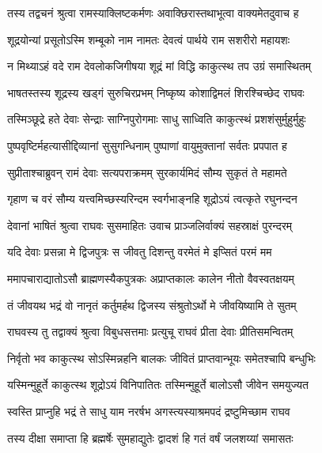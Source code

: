 
\twolineshloka
{तस्य तद्वचनं श्रुत्वा रामस्याक्लिष्टकर्मणः}
{अवाक्छिरास्तथाभूत्वा वाक्यमेतदुवाच ह} %

\twolineshloka
{शूद्रयोन्यां प्रसूतोऽस्मि शम्बूको नाम नामतः}
{देवत्वं पार्थये राम सशरीरो महायशः} %

\twolineshloka
{न मिथ्याऽहं वदे राम देवलोकजिगीषया}
{शूद्रं मां विद्धि काकुत्स्थ तप उग्रं समास्थितम्} %

\twolineshloka
{भाषतस्तस्य शूद्रस्य खड्गं सुरुचिरप्रभम्}
{निष्कृष्य कोशाद्विमलं शिरश्चिच्छेद राघवः} %

\twolineshloka
{तस्मिञ्छूद्रे हते देवाः सेन्द्राः साग्निपुरोगमाः}
{साधु साध्विति काकुत्स्थं प्रशशंसुर्मुहुर्मुहुः} %

\twolineshloka
{पुष्पवृष्टिर्महत्यासीद्दिव्यानां सुसुगन्धिनाम्}
{पुष्पाणां वायुमुक्तानां सर्वतः प्रपपात ह} %

\twolineshloka
{सुप्रीताश्चाब्रुवन् रामं देवाः सत्यपराक्रमम्}
{सुरकार्यमिदं सौम्य सुकृतं ते महामते} %

\twolineshloka
{गृहाण च वरं सौम्य यत्त्वमिच्छस्यरिन्दम}
{स्वर्गभाङ्नहि शूद्रोऽयं त्वत्कृते रघुनन्दन} %

\twolineshloka
{देवानां भाषितं श्रुत्वा राघवः सुसमाहितः}
{उवाच प्राञ्जलिर्वाक्यं सहस्राक्षं पुरन्दरम्} %

\twolineshloka
{यदि देवाः प्रसन्ना मे द्विजपुत्रः स जीवतु}
{दिशन्तु वरमेतं मे इप्सितं परमं मम} %

\twolineshloka
{ममापचाराद्यातोऽसौ ब्राह्मणस्यैकपुत्रकः}
{अप्राप्तकालः कालेन नीतो वैवस्वतक्षयम्} %

\twolineshloka
{तं जीवयथ भद्रं वो नानृतं कर्तुमर्हथ}
{द्विजस्य संश्रुतोऽर्थो मे जीवयिष्यामि ते सुतम्} %

\twolineshloka
{राघवस्य तु तद्वाक्यं श्रुत्वा विबुधसत्तमाः}
{प्रत्युचू राघवं प्रीता देवाः प्रीतिसमन्वितम्} %

\twolineshloka
{निर्वृतो भव काकुत्स्थ सोऽस्मिन्नहनि बालकः}
{जीवितं प्राप्तवान्भूयः समेतश्चापि बन्धुभिः} %

\twolineshloka
{यस्मिन्मुहूर्ते काकुत्स्थ शूद्रोऽयं विनिपातितः}
{तस्मिन्मुहूर्ते बालोऽसौ जीवेन समयुज्यत} %

\twolineshloka
{स्वस्ति प्राप्नुहि भद्रं ते साधु याम नरर्षभ}
{अगस्त्यस्याश्रमपदं द्रष्टुमिच्छाम राघव} %

\twolineshloka
{तस्य दीक्षा समाप्ता हि ब्रह्मर्षेः सुमहाद्युतेः}
{द्वादशं हि गतं वर्षं जलशय्यां समासतः} %

